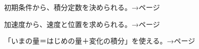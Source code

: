 \begin{furikaeri}
\begin{checklist}
\item 初期条件から、積分定数を決められる。\hfill{\footnotesize\sffamily\color{bkTheme}→\pageref{bk:5-13:shoki}ページ}
\item 加速度から、速度と位置を求められる。\hfill{\footnotesize\sffamily\color{bkTheme}→\pageref{bk:5-13:toukasoku}ページ}
\item 「いまの量＝はじめの量＋変化の積分」を使える。\hfill{\footnotesize\sffamily\color{bkTheme}→\pageref{bk:5-13:teisekibun}ページ}
\end{checklist}
\end{furikaeri}

